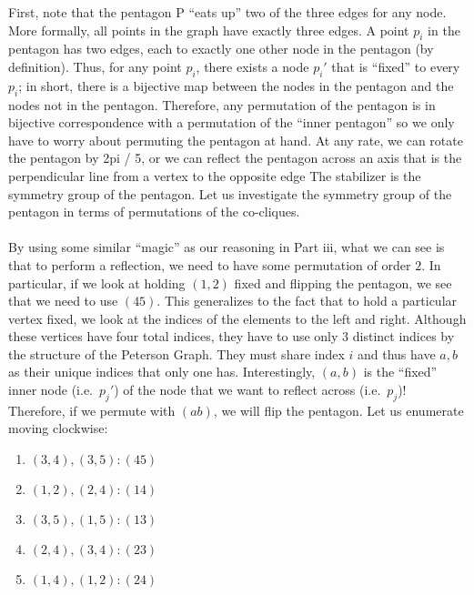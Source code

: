 \documentclass[letterpaper]{article}
\begin{document}
First, note that the pentagon P ``eats up'' two of the three edges for any node.
More formally, all points in the graph have exactly three edges.
A point $ p_i $ in the pentagon has two edges, each to exactly one other node in the pentagon (by definition).
Thus, for any point $ p_i $, there exists a node $ p_i' $ that is ``fixed'' to every $ p_i $; in short, there is a bijective map between the nodes in the pentagon and the nodes not in the pentagon.
Therefore, any permutation of the pentagon is in bijective correspondence with a permutation of the ``inner pentagon'' so we only have to worry about permuting the pentagon at hand.
At any rate, we can rotate the pentagon by 2pi / 5, or we can reflect the pentagon across an axis that is the perpendicular line from a vertex to the opposite edge
The stabilizer is the symmetry group of the pentagon.
Let us investigate the symmetry group of the pentagon in terms of permutations of the co-cliques.
\\ \\
By using some similar ``magic'' as our reasoning in Part iii, what we can see is that to perform a reflection, we need to have some permutation of order $ 2 $.
In particular, if we look at holding $ (1, 2) $ fixed and flipping the pentagon, we see that we need to use $ (45) $.
This generalizes to the fact that to hold a particular vertex fixed, we look at the indices of the elements to the left and right.
Although these vertices have four total indices, they have to use only $ 3 $ distinct indices by the structure of the Peterson Graph.
They must share index $ i $ and thus have $ a, b $ as their unique indices that only one has.
Interestingly, $ (a, b) $ is the ``fixed'' inner node (i.e.\ $ p_j' $) of the node that we want to reflect across (i.e.\ $ p_j $)!
Therefore, if we permute with $ (ab) $, we will flip the pentagon.
Let us enumerate moving clockwise:
\begin{enumerate}
    \item $ (3, 4), (3, 5) : (45) $
    \item $ (1, 2), (2, 4) : (14) $
    \item $ (3, 5), (1, 5) : (13) $
    \item $ (2, 4), (3, 4) : (23) $
    \item $ (1, 4), (1, 2) : (24) $
\end{enumerate}
\end{document}

